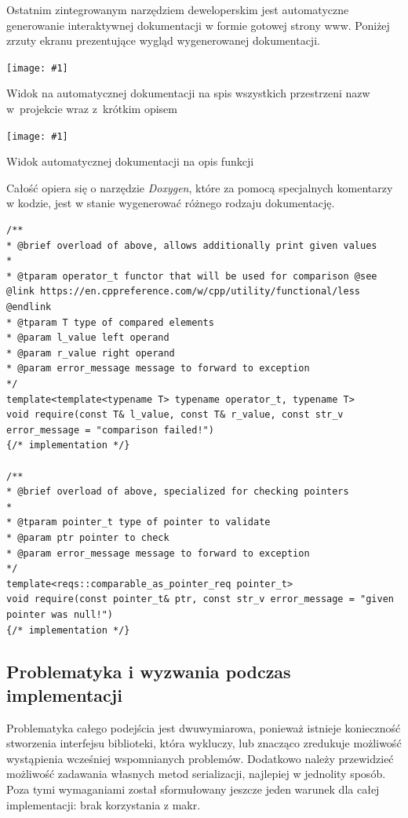 \documentclass[12pt]{article}
\newcommand{\n}{\newline}
\newcommand{\putss}[3]{
\begin{screenshot}[H]
	\centering
	\texttt{[image: \#1]}
	\caption{#2}
	\label{#3}
	\medskip
\end{screenshot}
}
\newcommand{\nonpl}[1]{{\it #1}}
\begin{document}
{{{				Ostatnim zintegrowanym narzędziem deweloperskim jest automatyczne generowanie interaktywnej dokumentacji w formie gotowej strony www. Poniżej zrzuty
				ekranu prezentujące wygląd wygenerowanej dokumentacji.\n

				\putss{./img/documentation_part_1.png}{Widok na automatycznej dokumentacji na spis wszystkich przestrzeni nazw w~projekcie wraz z~krótkim opisem}{docs_1}
				\putss{./img/documentation_part_2.png}{Widok automatycznej dokumentacji na opis funkcji}{docs_2}

				\newpage

				Całość opiera się o narzędzie \nonpl{Doxygen}\cite{doxygen_docs}, które za pomocą specjalnych komentarzy w kodzie,
				jest w stanie wygenerować różnego rodzaju dokumentację.\n

				\begin{lstlisting}[frame=single]
/**
* @brief overload of above, allows additionally print given values
*
* @tparam operator_t functor that will be used for comparison @see @link https://en.cppreference.com/w/cpp/utility/functional/less @endlink
* @tparam T type of compared elements
* @param l_value left operand
* @param r_value right operand
* @param error_message message to forward to exception
*/
template<template<typename T> typename operator_t, typename T>
void require(const T& l_value, const T& r_value, const str_v error_message = "comparison failed!")
{/* implementation */}

/**
* @brief overload of above, specialized for checking pointers
*
* @tparam pointer_t type of pointer to validate
* @param ptr pointer to check
* @param error_message message to forward to exception
*/
template<reqs::comparable_as_pointer_req pointer_t>
void require(const pointer_t& ptr, const str_v error_message = "given pointer was null!")
{/* implementation */}
				\end{lstlisting}
			}
		}

		{
			\subsection{Problematyka i wyzwania podczas implementacji}

			Problematyka całego podejścia jest dwuwymiarowa, ponieważ istnieje konieczność stworzenia interfejsu biblioteki, która wykluczy, lub znacząco
			zredukuje możliwość wystąpienia wcześniej wspomnianych problemów. Dodatkowo należy przewidzieć możliwość zadawania własnych metod serializacji,
			najlepiej w jednolity sposób. Poza tymi wymaganiami został sformułowany jeszcze jeden warunek dla całej implementacji: brak korzystania z makr.\n

}}
\end{document}
